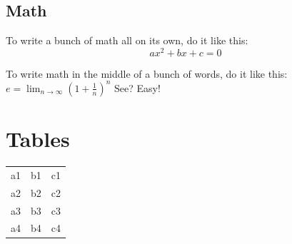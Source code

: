 \documentclass[11pt]{article} %
\begin{document}
\subsection{Math}
To write a bunch of math all on its own, do it like this:
\[ax^2 + bx + c = 0\] %

To write math in the middle of a bunch of words, do it like this: $e=\lim_{n\to\infty}\left(1+\frac{1}{n}\right)^n$ See? Easy!

\section{Tables}
\begin{center}
\begin{tabular}{|r|c l|} %
	\hline %
	a1 & b1 & c1 \\ %
	a2 & b2 & c2 \\
	a3 & b3 & c3 \\
	\hline
	a4 & b4 & c4 \\
	\hline
\end{tabular}
\end{center}
\end{document}
